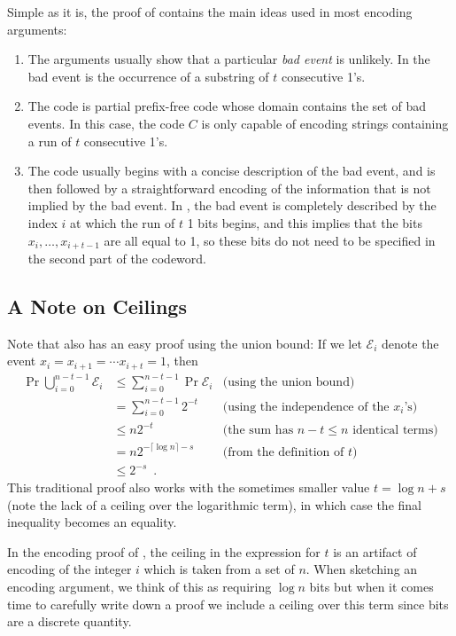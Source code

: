 \documentclass{patmorin}
\begin{document}
Simple as it is, the proof of  contains the main ideas
used in most encoding arguments:

\begin{enumerate}
\item The arguments usually show that a particular \emph{bad event} is
  unlikely. In  the bad event is the occurrence of a
  substring of $t$ consecutive 1's.

\item The code is partial prefix-free code whose domain contains the
  set of bad events. In this case, the code $C$ is only capable of
  encoding strings containing a run of $t$ consecutive 1's.

\item The code usually begins with a concise description of the bad
  event, and is then followed by a straightforward encoding of the
  information that is not implied by the bad event. In
  , the bad event is completely described by the index
  $i$ at which the run of $t$ 1 bits begins, and this implies that the
  bits $x_i,\ldots,x_{i+t-1}$ are all equal to 1, so these bits do not
  need to be specified in the second part of the codeword.
\end{enumerate}

\subsection{A Note on Ceilings}

Note that  also has an easy proof using the union
bound: If we let $\mathcal{E}_i$ denote the event
$x_i=x_{i+1}=\cdots x_{i+t}=1$, then
\begin{align*}
\Pr \bigcup_{i=0}^{n-t-1} \mathcal{E}_i  
   & \le \sum_{i=0}^{n-t-1} \Pr\mathcal{E}_i & \text{(using the union bound)}\\
   & = \sum_{i=0}^{n-t-1} 2^{-t} & \text{(using the independence of the $x_i$'s)}\\
   & \le n2^{-t} & \text{(the sum has $n-t\le n$ identical terms)}\\
   & = n2^{-\lceil\log n\rceil-s} & \text{(from the definition of $t$)}\\
   & \le 2^{-s} \enspace .
\end{align*}
This traditional proof also works with the sometimes smaller value
$t=\log n+s$ (note the lack of a ceiling over the logarithmic term),
in which case the final inequality becomes an equality.

In the encoding proof of , the ceiling in the
expression for $t$ is an artifact of encoding of the integer $i$ which
is taken from a set of $n$. When sketching an encoding argument, we
think of this as requiring $\log n$ bits but when it comes time to
carefully write down a proof we include a ceiling over this term since
bits are a discrete quantity.
\end{document}

